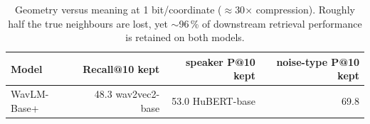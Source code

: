 \begin{table}[t]
\centering
\caption{Geometry versus meaning at 1 bit/coordinate ($\approx$30$\times$ compression). Roughly half the true neighbours are lost, yet $\sim$96\,\% of downstream retrieval performance is retained on both models.}
\label{tab:geo_vs_sem}
\begin{tabular}{lrrr}
\toprule
Model & Recall@10 kept & speaker P@10 kept & noise-type P@10 kept \\
\midrule
WavLM-Base+ & 48.3%
wav2vec2-base & 53.0%
HuBERT-base & 69.8%
\bottomrule
\end{tabular}
\end{table}